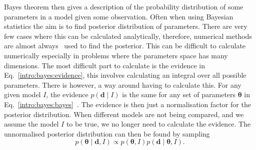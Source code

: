 Bayes theorem then gives a description of the probability distribution of some
parameters in a model given some observation.  Often when using Bayesian
statistics the aim is to find posterior distribution of parameters.  There are
very few cases where this can be calculated analytically, therefore, numerical
methods are almost always~ used to find the posterior.  This
can be difficult to calculate numerically especially in problems where the
parameters space has many dimensions.  The most difficult part to calculate is
the evidence in Eq.~\ref{intro:bayes:evidence}, this involves calculating an
integral over all possible parameters.  There is however, a way around having
to calculate this.  For any given model $I$, the evidence $p({\bm d}\mid I)$ is
the same for any set of parameters ${\bm \theta}$ in
Eq.~\ref{intro:bayes:bayes}~.
The evidence is then just a normalisation factor for the posterior
distribution.  When different models are not being compared, and we assume the
model $I$ to be true, we no longer need to calculate the evidence.  The
unnormalised posterior distribution can then be found by sampling~
%
\begin{equation}
p({\bm \theta} \mid {\bm d}, I) \propto p({\bm \theta}, I)p({\bm d} \mid {\bm \theta}, I).
\end{equation}

